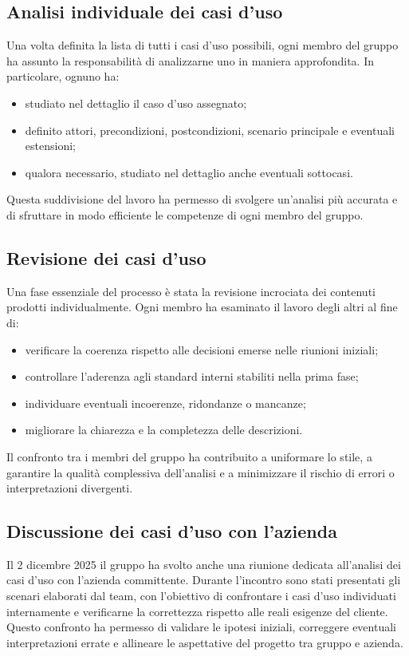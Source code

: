 \documentclass[11pt,a4paper]{article}
\begin{document}
\subsection{Analisi individuale dei casi d'uso}
Una volta definita la lista di tutti i casi d’uso possibili, ogni membro del gruppo ha assunto la responsabilità di analizzarne uno in maniera approfondita. In particolare, ognuno ha:
\begin{itemize}
\item studiato nel dettaglio il caso d’uso assegnato;
\item definito attori, precondizioni, postcondizioni, scenario principale e eventuali estensioni;
\item qualora necessario, studiato nel dettaglio anche eventuali sottocasi.
\end{itemize}
Questa suddivisione del lavoro ha permesso di svolgere un’analisi più accurata e di sfruttare in modo efficiente le competenze di ogni membro del gruppo.

\subsection{Revisione dei casi d'uso}
Una fase essenziale del processo è stata la revisione incrociata dei contenuti prodotti individualmente.
Ogni membro ha esaminato il lavoro degli altri al fine di:
\begin{itemize}
\item verificare la coerenza rispetto alle decisioni emerse nelle riunioni iniziali;
\item controllare l’aderenza agli standard interni stabiliti nella prima fase;
\item individuare eventuali incoerenze, ridondanze o mancanze;
\item migliorare la chiarezza e la completezza delle descrizioni.
\end{itemize}
Il confronto tra i membri del gruppo ha contribuito a uniformare lo stile, a garantire la qualità complessiva dell’analisi e a minimizzare il rischio di errori o interpretazioni divergenti.

\subsection{Discussione dei casi d’uso con l’azienda}
Il 2 dicembre 2025 il gruppo ha svolto anche una riunione dedicata all'analisi dei casi d'uso con l’azienda committente. Durante l’incontro sono stati presentati gli scenari elaborati dal team, con l’obiettivo di confrontare i casi d’uso individuati internamente e verificarne la correttezza rispetto alle reali esigenze del cliente. Questo confronto ha permesso di validare le ipotesi iniziali, correggere eventuali interpretazioni errate e allineare le aspettative del progetto tra gruppo e azienda.
\end{document}
